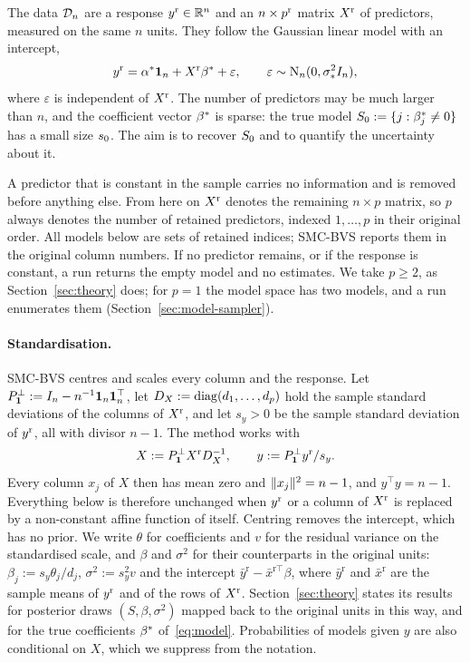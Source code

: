The data $\mathcal D_n$ are a response $y^{\mathrm r}\in\mathbb{R}^n$ and an $n\times p^{\mathrm r}$ matrix $X^{\mathrm r}$ of predictors, measured on the same $n$
units. They follow the Gaussian linear model with an intercept,
\begin{equation}\label{eq:model}
  y^{\mathrm r}=\alpha^*\mathbf{1}_n+X^{\mathrm r}\beta^*+\varepsilon,\qquad \varepsilon\sim\mathrm{N}_n(0,\sigma_*^2I_n),
\end{equation}
where $\varepsilon$ is independent of $X^{\mathrm r}$. The number of predictors may be much larger than $n$, and the coefficient
vector $\beta^*$ is sparse: the true model $S_0:=\{j:\beta^*_j\neq0\}$ has a small size $s_0$. The aim is to recover
$S_0$ and to quantify the uncertainty about it.

A predictor that is constant in the sample carries no information and is removed before anything else. From here on
$X^{\mathrm r}$ denotes the remaining $n\times p$ matrix, so $p$ always denotes the number of retained predictors, indexed
$1,\dots,p$ in their original order. All models below are sets of retained indices; SMC-BVS reports them in the
original column numbers. If no predictor remains, or if the response is constant, a run returns the empty model and
no estimates. We take $p\ge2$, as Section~\ref{sec:theory} does; for $p=1$ the model space has two models, and a run
enumerates them (Section~\ref{sec:model-sampler}).

\paragraph{Standardisation.} SMC-BVS centres and scales every column and the response. Let
$P^\perp_{\mathbf{1}}:=I_n-n^{-1}\mathbf{1}_n\mathbf{1}_n^\top$, let $D_X:=\operatorname{diag}(d_1,\dots,d_p)$ hold the sample standard
deviations of the columns of $X^{\mathrm r}$, and let $s_y>0$ be the sample standard deviation of $y^{\mathrm r}$, all with divisor
$n-1$. The method works with
\begin{equation}\label{eq:standardise}
  X:=P^\perp_{\mathbf{1}}X^{\mathrm r} D_X^{-1},\qquad y:=P^\perp_{\mathbf{1}}y^{\mathrm r}/s_y .
\end{equation}
Every column $x_j$ of $X$ then has mean zero and $\lVert x_j\rVert^2=n-1$, and $y^\top y=n-1$. Everything below is
therefore unchanged when $y^{\mathrm r}$ or a column of $X^{\mathrm r}$ is replaced by a non-constant affine function of itself. Centring
removes the intercept, which has no prior. We write $\theta$ for coefficients and $v$ for the residual variance on the standardised
scale, and $\beta$ and $\sigma^2$ for their counterparts in the original units: $\beta_j:=s_y\theta_j/d_j$,
$\sigma^2:=s_y^2v$ and the intercept $\bar y^{\mathrm r}-\bar x^{\mathrm r\top}\beta$, where $\bar y^{\mathrm r}$
and $\bar x^{\mathrm r}$ are the sample means of $y^{\mathrm r}$ and of the rows of $X^{\mathrm r}$. Section~\ref{sec:theory} states its
results for posterior draws $(S,\beta,\sigma^2)$ mapped back to the original units in this way, and for the true
coefficients $\beta^*$ of~\eqref{eq:model}. Probabilities of models given $y$ are also conditional on $X$, which we
suppress from the notation.

